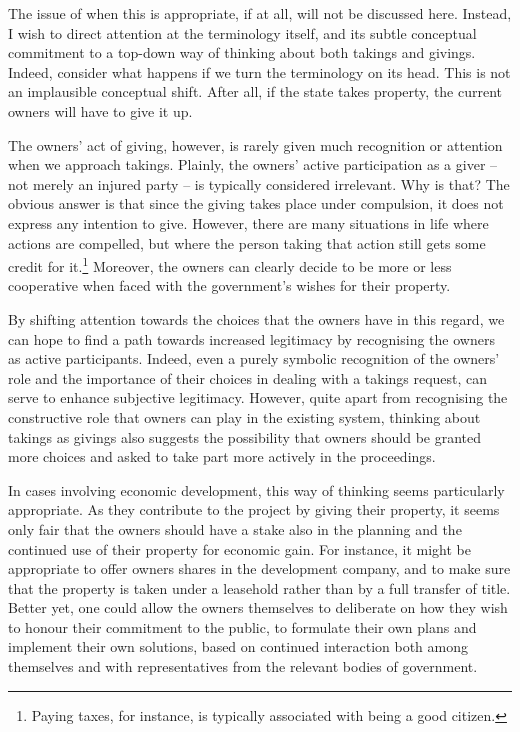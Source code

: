 {The issue of when this is appropriate, if at all, will not be discussed here. Instead, I wish to direct attention at the terminology itself, and its subtle conceptual commitment to a top-down way of thinking about both takings and givings. Indeed, consider what happens if we turn the terminology on its head. This is not an implausible conceptual shift. After all, if the state takes property, the current owners will have to give it up.

The owners' act of giving, however, is rarely given much recognition or attention when we approach takings. Plainly, the owners' active participation as a giver -- not merely an injured party -- is typically considered irrelevant. Why is that? The obvious answer is that since the giving takes place under compulsion, it does not express any intention to give. However, there are many situations in life where actions are compelled, but where the person taking that action still gets some credit for it.\footnote{Paying taxes, for instance, is typically associated with being a good citizen.} Moreover, the owners can clearly decide to be more or less cooperative when faced with the government's wishes for their property. 

By shifting attention towards the choices that the owners have in this regard, we can hope to find a path towards increased legitimacy by recognising the owners as active participants. Indeed, even a purely symbolic recognition of the owners' role and the importance of their choices in dealing with a takings request, can serve to enhance subjective legitimacy. However, quite apart from recognising the constructive role that owners can play in the existing system, thinking about takings as givings also suggests the possibility that owners should be granted more choices and asked to take part more actively in the proceedings.


In cases involving economic development, this way of thinking seems particularly appropriate. As they contribute to the project by giving their property, it seems only fair that the owners should have a stake also in the planning and the continued use of their property for economic gain. For instance, it might be appropriate to offer owners shares in the development company, and to make sure that the property is taken under a leasehold rather than by a full transfer of title. Better yet, one could allow the owners themselves to deliberate on how they wish to honour their commitment to the public, to formulate their own plans and implement their own solutions, based on continued interaction both among themselves and with representatives from the relevant bodies of government.

}
